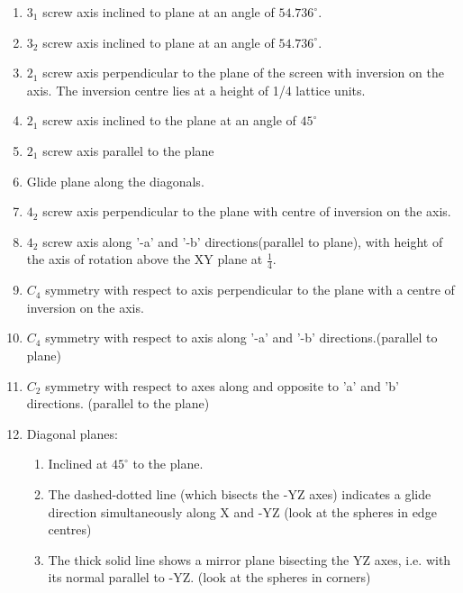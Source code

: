 \documentclass{homework}
\begin{document}
\begin{enumerate}
    \item $3_1$ screw axis inclined to plane at an angle of $54.736^{\circ}$.
    \item $3_2$ screw axis inclined to plane at an angle of $54.736^{\circ}$.
    \item $2_1$ screw axis perpendicular to the plane of the screen with inversion on the axis. The inversion centre lies at a height of 1/4 lattice units.
    \item $2_1$ screw axis inclined to the plane at an angle of $45^{\circ}$
    \item $2_1$ screw axis parallel to the plane
    \item Glide plane along the diagonals.
    \item $4_2$ screw axis perpendicular to the plane with centre of inversion on the axis.
    \item $4_2$ screw axis along '-a' and '-b' directions(parallel to plane), with height of the axis of rotation above the XY plane at $\frac{1}{4}$.
    \item $C_4$ symmetry with respect to axis perpendicular to the plane with a centre of inversion on the axis.
    \item $C_4$ symmetry with respect to axis along '-a' and '-b' directions.(parallel to plane)
    \item $C_2$ symmetry with respect to axes along and opposite to 'a' and 'b' directions. (parallel to the plane)
    \item Diagonal planes:
    \begin{enumerate}
        \item Inclined at $45^{\circ}$ to the plane.
        \item The dashed-dotted line (which bisects the -YZ axes) indicates a glide direction simultaneously along X and -YZ (look at the spheres in edge centres)
        \item The thick solid line shows a mirror plane bisecting the YZ axes, i.e. with its normal parallel to -YZ. (look at the spheres in corners)
    \end{enumerate} 
    
\end{enumerate}
\end{document}
